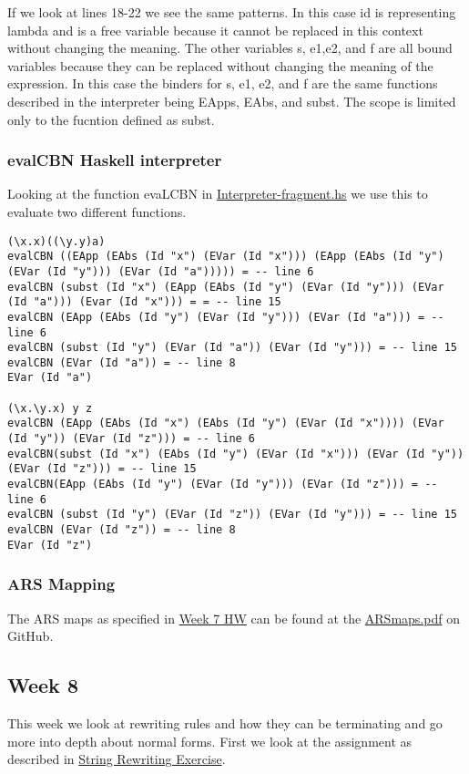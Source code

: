 \documentclass{article}
\theoremstyle{theorem}
\theoremstyle{definition}
\theoremstyle{remark}
\begin{document}
\medskip
If we look at lines 18-22 we see the same patterns. In this case id is representing lambda and is a free variable because it cannot be replaced in this context without changing the meaning. The other variables s, e1,e2, and f are all bound variables because they can be replaced without changing the meaning of the expression. In this case the binders for s, e1, e2, and f are the same functions described in the interpreter being EApps, EAbs, and subst. The scope is limited only to the fucntion defined as subst.

\subsubsection{evalCBN Haskell interpreter}
\medskip
Looking at the function evaLCBN in \href{https://github.com/alexhkurz/programming-languages-2022/blob/main/src/LambdaNat0/src/Interpreter-fragment.hs}{Interpreter-fragment.hs} we use this to evaluate two different functions.
\begin{lstlisting}
(\x.x)((\y.y)a)
evalCBN ((EApp (EAbs (Id "x") (EVar (Id "x"))) (EApp (EAbs (Id "y") (EVar (Id "y"))) (EVar (Id "a"))))) = -- line 6
evalCBN (subst (Id "x") (EApp (EAbs (Id "y") (EVar (Id "y"))) (EVar (Id "a"))) (Evar (Id "x"))) = = -- line 15
evalCBN (EApp (EAbs (Id "y") (EVar (Id "y"))) (EVar (Id "a"))) = -- line 6
evalCBN (subst (Id "y") (EVar (Id "a")) (EVar (Id "y"))) = -- line 15
evalCBN (EVar (Id "a")) = -- line 8
EVar (Id "a")

(\x.\y.x) y z
evalCBN (EApp (EAbs (Id "x") (EAbs (Id "y") (EVar (Id "x")))) (EVar (Id "y")) (EVar (Id "z"))) = -- line 6
evalCBN(subst (Id "x") (EAbs (Id "y") (EVar (Id "x"))) (EVar (Id "y")) (EVar (Id "z"))) = -- line 15
evalCBN(EApp (EAbs (Id "y") (EVar (Id "y"))) (EVar (Id "z"))) = -- line 6
evalCBN (subst (Id "y") (EVar (Id "z")) (EVar (Id "y"))) = -- line 15
evalCBN (EVar (Id "z")) = -- line 8
EVar (Id "z")
\end{lstlisting}
\subsubsection{ARS Mapping}
The ARS maps as specified in \href{https://hackmd.io/@alexhkurz/BJ7AoGcVK}{Week 7 HW} can be found at the  \href{https://github.com/dapak2002/Pak-D-CPSC-354-Report/blob/main/src/ARSmaps.pdf}{ARSmaps.pdf} on GitHub. 

\subsection{Week 8}
This week we look at rewriting rules and how they can be terminating and go more into depth about normal forms. First we look at the assignment as described in \href{https://hackmd.io/@alexhkurz/Syn23oMHF}{String Rewriting Exercise}.
\end{document}
